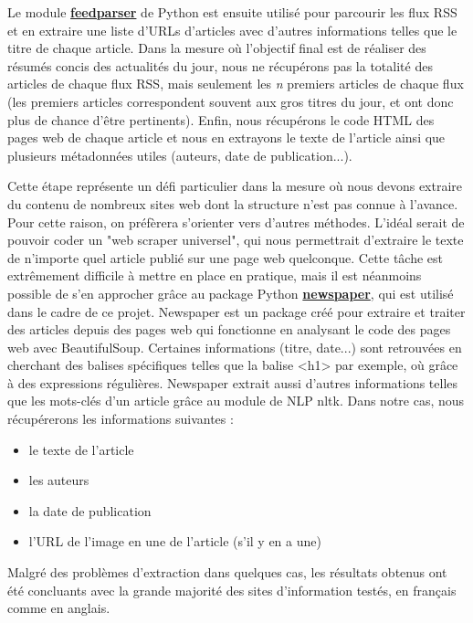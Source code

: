 \documentclass[french]{article}
\begin{document}
    Le module \textbf{\href{https://pypi.org/project/feedparser/}{feedparser}} de Python est ensuite utilisé pour parcourir les flux RSS et en extraire une liste d'URLs d'articles avec d'autres informations telles que le titre de chaque article. Dans la mesure où l'objectif final est de réaliser des résumés concis des actualités du jour, nous ne récupérons pas la totalité des articles de chaque flux RSS, mais seulement les \textit{n} premiers articles de chaque flux (les premiers articles correspondent souvent aux gros titres du jour, et ont donc plus de chance d'être pertinents).
    Enfin, nous récupérons le code HTML des pages web de chaque article et nous en extrayons le texte de l'article ainsi que plusieurs métadonnées utiles (auteurs, date de publication...). 

    Cette étape représente un défi particulier dans la mesure où nous devons extraire du contenu de nombreux sites web dont la structure n'est pas connue à l'avance. Pour cette raison, on préfèrera s'orienter vers d'autres méthodes. L'idéal serait de pouvoir coder un "web scraper universel", qui nous permettrait d'extraire le texte de n'importe quel article publié sur une page web quelconque. Cette tâche est extrêmement difficile à mettre en place en pratique, mais il est néanmoins possible de s'en approcher grâce au package Python \textbf{\href{https://newspaper.readthedocs.io/en/latest/}{newspaper}}, qui est utilisé dans le cadre de ce projet.
    Newspaper est un package créé pour extraire et traiter des articles depuis des pages web qui fonctionne en analysant le code des pages web avec BeautifulSoup. Certaines informations (titre, date...) sont retrouvées en cherchant des balises spécifiques telles que la balise <h1> par exemple, où grâce à des expressions régulières. Newspaper extrait aussi d'autres informations telles que les mots-clés d'un article grâce au module de NLP nltk. Dans notre cas, nous récupérerons les informations suivantes :
    \begin{itemize}
        \item le texte de l'article
        \item les auteurs
        \item la date de publication
        \item l'URL de l'image en une de l'article (s'il y en a une)
    \end{itemize}
    Malgré des problèmes d'extraction dans quelques cas, les résultats obtenus ont été concluants avec la grande majorité des sites d'information testés, en français comme en anglais.
\end{document}
